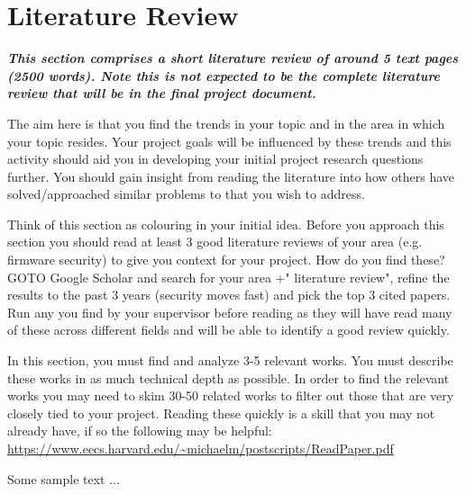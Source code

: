 \documentclass{article} %
\newcommand{\hint}[1] {\par {\bfseries \color{Blue} \it #1 \par}}
\begin{document}
\section{Literature Review}
\hint{
{\color{red}This section comprises a short literature review of around 5 text pages (2500 words). Note this is not expected to be the complete literature review that will be in the final project document.}

The aim here is that you find the trends in your topic and in the area in which your topic resides. Your project goals will be influenced by these trends and this activity should aid you in  developing your initial project research questions further. You should gain insight from reading the literature into how others have solved/approached similar problems to that you wish to address. 

Think of this section as colouring in your initial idea. Before you approach this section you should read at least 3 good literature reviews of your area (e.g. firmware security) to give you context for your project. How do you find these? GOTO Google Scholar and search for your area +" literature review", refine the results to the past 3 years (security moves fast) and pick the top 3 cited papers. Run any you find by your supervisor before reading as they will have read many of these across different fields and will be able to identify a good review quickly. 

In this section, you must find and analyze 3-5 relevant works.  You must describe these works in as much technical depth as possible. In order to find the relevant works you may need to skim 30-50 related works to filter out those that are very closely tied to your project. Reading these quickly is a skill that you may not already have, if so the following may be helpful: \url{https://www.eecs.harvard.edu/~michaelm/postscripts/ReadPaper.pdf}
}
 

Some sample text ...
\end{document}
